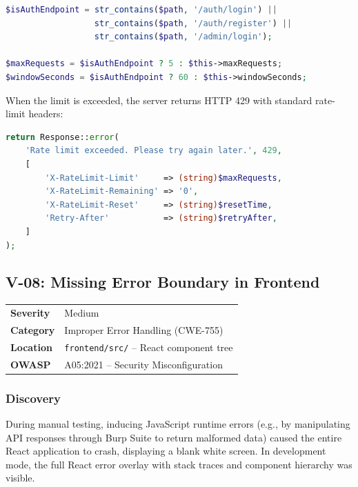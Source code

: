 \documentclass[12pt,a4paper]{article}
\begin{document}
\begin{lstlisting}[language=PHP, caption={RateLimitMiddleware.php -- Tiered rate limiting}]
$isAuthEndpoint = str_contains($path, '/auth/login') ||
                  str_contains($path, '/auth/register') ||
                  str_contains($path, '/admin/login');

$maxRequests = $isAuthEndpoint ? 5 : $this->maxRequests;
$windowSeconds = $isAuthEndpoint ? 60 : $this->windowSeconds;
\end{lstlisting}

When the limit is exceeded, the server returns HTTP 429 with standard rate-limit headers:

\begin{lstlisting}[language=PHP, caption={Rate limit response headers}]
return Response::error(
    'Rate limit exceeded. Please try again later.', 429,
    [
        'X-RateLimit-Limit'     => (string)$maxRequests,
        'X-RateLimit-Remaining' => '0',
        'X-RateLimit-Reset'     => (string)$resetTime,
        'Retry-After'           => (string)$retryAfter,
    ]
);
\end{lstlisting}

\subsection{V-08: Missing Error Boundary in Frontend}

\begin{table}[H]
\centering
\begin{tabularx}{\textwidth}{lX}
\toprule
\textbf{Severity} & \textcolor{medium}{Medium} \\
\textbf{Category} & Improper Error Handling (CWE-755) \\
\textbf{Location} & \texttt{frontend/src/} -- React component tree \\
\textbf{OWASP} & A05:2021 -- Security Misconfiguration \\
\bottomrule
\end{tabularx}
\end{table}

\subsubsection{Discovery}

During manual testing, inducing JavaScript runtime errors (e.g., by manipulating API responses through Burp Suite to return malformed data) caused the entire React application to crash, displaying a blank white screen. In development mode, the full React error overlay with stack traces and component hierarchy was visible.
\end{document}
